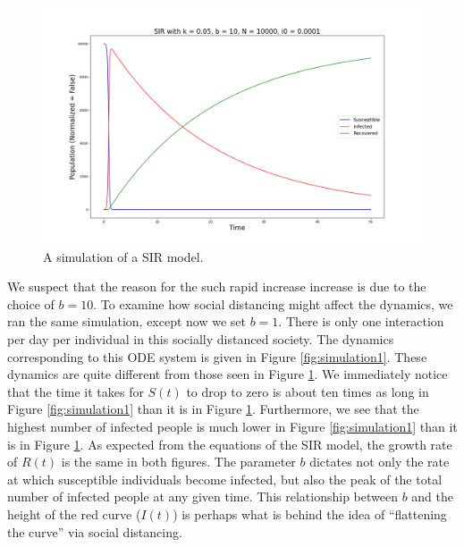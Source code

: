 \documentclass[12pt, reqno]{amsart}
\begin{document}
    \begin{figure}
        \centering
        \includegraphics[scale=0.8]{sir_ode_simulation0.png}
        \caption{A simulation of a SIR model.}
        \label{fig:simulation0}
    \end{figure}

    We suspect that the reason for the such rapid increase increase is due to the choice of \(b = 10\). To examine how social distancing might affect the dynamics, we ran the same simulation, except now we set \(b = 1\). There is only one interaction per day per individual in this socially distanced society. The dynamics corresponding to this ODE system is given in Figure \ref{fig:simulation1}. These dynamics are quite different from those seen in Figure \ref{fig:simulation0}. We immediately notice that the time it takes for \(S(t)\) to drop to zero is about ten times as long in Figure \ref{fig:simulation1} than it is in Figure \ref{fig:simulation0}. Furthermore, we see that the highest number of infected people is much lower in Figure \ref{fig:simulation1} than it is in Figure \ref{fig:simulation0}. As expected from the equations of the SIR model, the growth rate of \(R(t)\) is the same in both figures. The parameter \(b\) dictates not only the rate at which susceptible individuals become infected, but also the peak of the total number of infected people at any given time. This relationship between \(b\) and the height of the red curve (\(I(t)\)) is perhaps what is behind the idea of ``flattening the curve'' via social distancing. 
    
\end{document}
